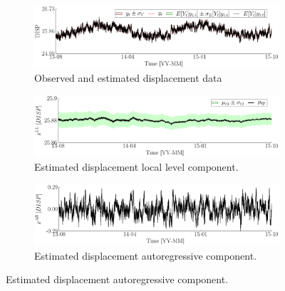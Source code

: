 \begin{figure}[h!]
\centering
\begin{subfigure}{\linewidth}
\includegraphics[width=0.9\linewidth]{./docfigs/Example_DISPTEMPSIM/optim_param_optim_initialhiddenstate/DISP_ObservedPredicted.pdf}
\caption{Observed and estimated displacement data} 
\end{subfigure}
\begin{subfigure}{\linewidth}
\includegraphics[width=0.9\linewidth]{./docfigs/Example_DISPTEMPSIM/optim_param_optim_initialhiddenstate/DISP_LL_1.pdf}
\caption{Estimated displacement local level component.}
\end{subfigure}
\begin{subfigure}{\linewidth}
\includegraphics[width=0.9\linewidth]{./docfigs/Example_DISPTEMPSIM/optim_param_optim_initialhiddenstate/DISP_AR_2.pdf}
\caption{Estimated displacement autoregressive component.}
\end{subfigure}
\end{figure}
